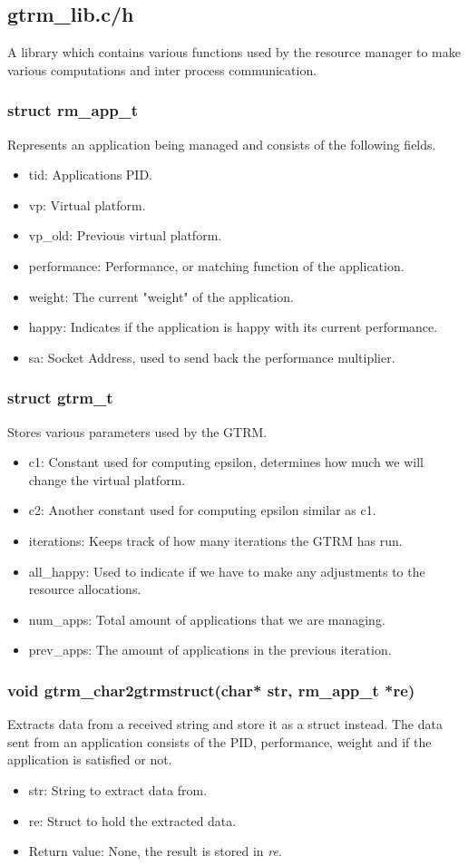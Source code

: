 \documentclass[nobiblatex]{LTHthesis}
\begin{document}
\subsection{gtrm\_lib.c/h}
A library which contains various functions used by the resource manager to make various computations and inter process communication.

\subsubsection{struct rm\_app\_t}
Represents an application being managed and consists of the following fields.
\begin{itemize}
\item tid: Applications PID.
\item vp: Virtual platform.
\item vp\_old: Previous virtual platform.
\item performance: Performance, or matching function of the application.
\item weight: The current "weight" of the application.
\item happy: Indicates if the application is happy with its current performance.
\item sa: Socket Address, used to send back the performance multiplier.
\end{itemize}

\subsubsection{struct gtrm\_t}
Stores various parameters used by the GTRM.
\begin{itemize}
\item c1: Constant used for computing epsilon, determines how much we will change the virtual platform.
\item c2: Another constant used for computing epsilon similar as c1.
\item iterations: Keeps track of how many iterations the GTRM has run.
\item all\_happy: Used to indicate if we have to make any adjustments to the resource allocations.
\item num\_apps: Total amount of applications that we are managing.
\item prev\_apps: The amount of applications in the previous iteration.
\end{itemize}

\subsubsection{void gtrm\_char2gtrmstruct(char* str, rm\_app\_t *re)}
Extracts data from a received string and store it as a struct instead. The data sent from an application consists of the PID, performance, weight and if the application is satisfied or not.
\begin{itemize} 
\item str: String to extract data from.
\item re: Struct to hold the extracted data.
\item Return value: None, the result is stored in \emph{re}.
\end{itemize}
\end{document}
